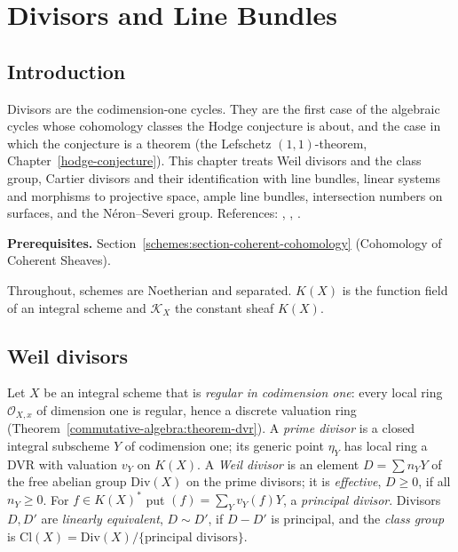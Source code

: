 \chapter{Divisors and Line Bundles}\label{divisors}

\section{Introduction}\label{divisors:section-introduction}

Divisors are the codimension-one cycles. They are the first case of the algebraic cycles whose cohomology classes the Hodge conjecture is
about, and the case in which the conjecture is a theorem (the Lefschetz $(1,1)$-theorem, Chapter~\ref{hodge-conjecture}). This chapter treats
Weil divisors and the class group, Cartier divisors and their identification with line bundles, linear systems and morphisms to projective
space, ample line bundles, intersection numbers on surfaces, and the N\'eron--Severi group. References: \cite[Sections II.6, II.7 and V.1]{hartshorne-ag},
\cite[Chapter 1]{lazarsfeld-positivity-1}, \cite[Chapter I]{beauville-surfaces}.

\noindent\textbf{Prerequisites.} Section~\ref{schemes:section-coherent-cohomology} (Cohomology of Coherent Sheaves).

Throughout, schemes are Noetherian and separated. $K(X)$ is the function field of an integral scheme and $\mathcal{K}_X$ the constant sheaf $K(X)$.

\section{Weil divisors}\label{divisors:section-weil}

\begin{definition}\label{divisors:definition-weil}
Let $X$ be an integral scheme that is \emph{regular in codimension one}: every local ring $\mathcal{O}_{X,x}$ of dimension one is regular, hence a discrete valuation ring
(Theorem~\ref{commutative-algebra:theorem-dvr}). A \emph{prime divisor} is a closed integral subscheme $Y$ of codimension one; its generic point $\eta_Y$ has local
ring a DVR with valuation $v_Y$ on $K(X)$. A \emph{Weil divisor} is an element $D = \sum n_YY$ of the free abelian group $\mathrm{Div}(X)$ on the prime divisors; it is
\emph{effective}, $D \geq 0$, if all $n_Y \geq 0$. For $f \in K(X)^*$ put $(f) = \sum_Yv_Y(f)Y$, a \emph{principal divisor}. Divisors $D, D'$ are \emph{linearly
equivalent}, $D \sim D'$, if $D - D'$ is principal, and the \emph{class group} is $\mathrm{Cl}(X) = \mathrm{Div}(X)/\{\text{principal divisors}\}$.
\end{definition}

